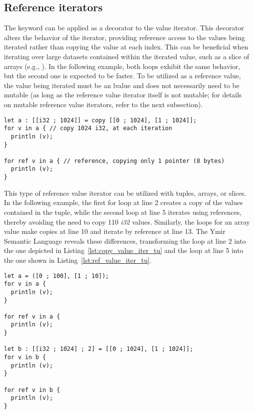 \subsection{Reference iterators}

The  keyword can be applied as a decorator to the value iterator.
This decorator alters the behavior of the iterator, providing reference access
to the values being iterated rather than copying the value at each index. This
can be beneficial when iterating over large datasets contained within the
iterated value, such as a slice of arrays (e.g., \token{[[c8; 1024]]}). In the
following example, both loops exhibit the same behavior, but the second one is
expected to be faster. To be utilized as a reference value, the value being
iterated must be an lvalue and does not necessarily need to be mutable (as long
as the reference value iterator itself is not mutable; for details on mutable
reference value iterators, refer to the next subsection).

\begin{lstlisting}[style=coloredverbatim, escapechar=@]
let a : [[i32 ; 1024]] = copy [[0 ; 1024], [1 ; 1024]];
for v in a { // copy 1024 i32, at each iteration
  println (v);
}

for ref v in a { // reference, copying only 1 pointer (8 bytes)
  println (v);
}
\end{lstlisting}

This type of reference value iterator can be utilized with tuples, arrays, or
slices. In the following example, the first for loop at line 2 creates a copy of
the values contained in the tuple, while the second loop at line 5 iterates
using references, thereby avoiding the need to copy 110 \textit{i32} values.
Similarly, the loops for an array value make copies at line 10 and iterate by
reference at line 13. The Ymir Semantic Language reveals these differences,
transforming the loop at line 2 into the one depicted in
Listing~\ref{lst:copy_value_iter_tu} and the loop at line 5 into the one shown
in Listing~\ref{lst:ref_value_iter_tu}.

\begin{lstlisting}[style=coloredverbatim, caption=iteration using reference value iterator, label=lst:ref_value_iter_ex]
let a = ([0 ; 100], [1 ; 10]);
for v in a {
  println (v);
}

for ref v in a {
  println (v);
}

let b : [[i32 ; 1024] ; 2] = [[0 ; 1024], [1 ; 1024]];
for v in b {
  println (v);
}

for ref v in b {
  println (v);
}
\end{lstlisting}


